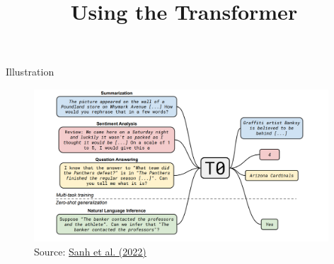 



\newcommand{\titlefigure}{figure/sesamestreet.jpeg}
\newcommand{\learninggoals}{
\item }

\title{Using the Transformer}
\date{}




\begin{frame}{Illustration}

\vfill
	
	\begin{figure}
		\centering
		\includegraphics[width = 11cm]{figure/t0.png}\\ 
		\footnotesize{Source:} \href{https://arxiv.org/pdf/2110.08207.pdf}{\footnotesize Sanh et al. (2022)}
	\end{figure}
	
\vfill

\end{frame}


